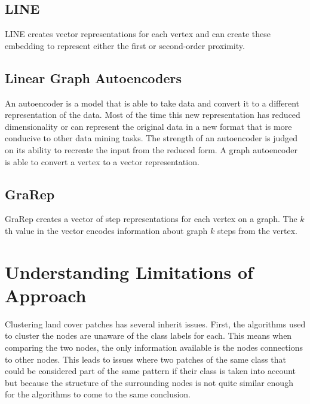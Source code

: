 \documentclass[conference]{IEEEtran}
\begin{document}
	\subsection{LINE \cite{Tang2015LINELI}}
	LINE creates vector representations for each vertex and can create these embedding to represent either the first or second-order proximity. 
	
	\subsection{Linear Graph Autoencoders \cite{SalhaGalvan2019KeepIS}}
	An autoencoder is a model that is able to take data and convert it to a different representation of the data. Most of the time this new representation has reduced dimensionality or can represent the original data in a new format that is more conducive to other data mining tasks. The strength of an autoencoder is judged on its ability to recreate the input from the reduced form. A graph autoencoder is able to convert a vertex to a vector representation.
	
	\subsection{GraRep \cite{Cao2015GraRepLG}}
	GraRep creates a vector of step representations for each vertex on a graph. The ${k}$th value in the vector encodes information about graph ${k}$ steps from the vertex.
	
	\section{Understanding Limitations of Approach}
	Clustering land cover patches has several inherit issues. First, the algorithms used to cluster the nodes are unaware of the class labels for each. This means when comparing the two nodes, the only information available is the nodes connections to other nodes. This leads to issues where two patches of the same class that could be considered part of the same pattern if their class is taken into account but because the structure of the surrounding nodes is not quite similar enough for the algorithms to come to the same conclusion.
	
\end{document}
